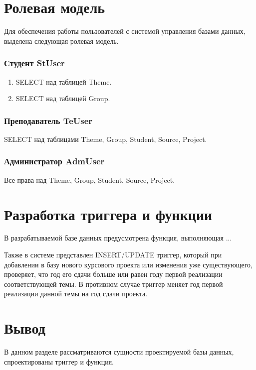 \section{Ролевая модель}

Для обеспечения работы пользователей с системой управления базами данных, выделена
следующая ролевая модель.

\subsubsection*{Студент StUser}

\begin{enumerate}
	\item SELECT над таблицей Theme.
	\item SELECT над таблицей Group.
\end{enumerate}


\subsubsection*{Преподаватель TeUser}

	SELECT над таблицами Theme, Group, Student, Source, Project.



\subsubsection*{Администратор AdmUser}

	Все права над Theme, Group, Student, Source, Project.


\section{Разработка триггера и функции}

В разрабатываемой базе данных предусмотрена функция, выполняющая ...

Также в системе представлен INSERT/UPDATE триггер, который при добавлении в базу нового курсового проекта или изменения уже существующего, проверяет, что год его сдачи больше или равен году первой реализации соответствующей темы. В противном случае триггер меняет год первой реализации данной темы на год сдачи проекта.


\section{Вывод}
В данном разделе рассматриваются сущности проектируемой базы данных, спроектированы триггер и функция.